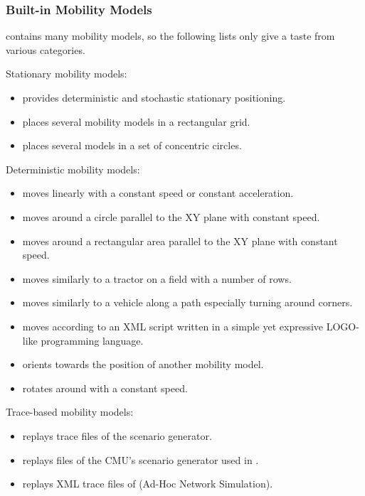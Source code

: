 \subsubsection*{Built-in Mobility Models}
\inet contains many mobility models, so the following lists only give a taste from various categories.

Stationary mobility models:

\begin{itemize}
        \item {} provides deterministic and stochastic stationary positioning.
        \item {} places several mobility models in a rectangular grid.
        \item {} places several models in a set of concentric circles.
\end{itemize}

Deterministic mobility models:

\begin{itemize}
        \item {} moves linearly with a constant speed or constant acceleration.
        \item {} moves around a circle parallel to the XY plane with constant speed.
        \item {} moves around a rectangular area parallel to the XY plane with constant speed.
        \item {} moves similarly to a tractor on a field with a number of rows.
        \item {} moves similarly to a vehicle along a path especially turning around corners.
        \item {} moves according to an XML script written in a simple yet expressive LOGO-like programming language.
        \item {} orients towards the position of another mobility model.
        \item {} rotates around with a constant speed.
\end{itemize}

Trace-based mobility models:

\begin{itemize}
        \item {} replays trace files of the  scenario generator.
        \item {} replays files of the CMU’s scenario generator used in .
        \item {} replays XML trace files of  (Ad-Hoc Network Simulation).
\end{itemize}

